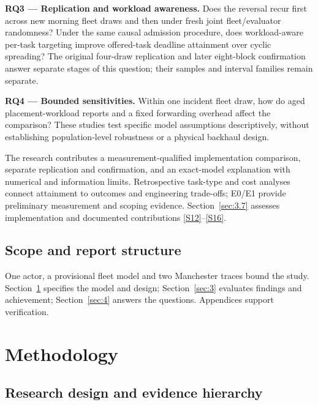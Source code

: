 \documentclass[11pt,a4paper]{article}
\begin{document}
\textbf{RQ3 --- Replication and workload awareness.} Does the reversal recur first across new morning fleet draws and then under fresh joint fleet/evaluator randomness? Under the same causal admission procedure, does workload-aware per-task targeting improve offered-task deadline attainment over cyclic spreading? The original four-draw replication and later eight-block confirmation answer separate stages of this question; their samples and interval families remain separate.

\textbf{RQ4 --- Bounded sensitivities.} Within one incident fleet draw, how do aged placement-workload reports and a fixed forwarding overhead affect the comparison? These studies test specific model assumptions descriptively, without establishing population-level robustness or a physical backhaul design.

The research contributes a measurement-qualified implementation comparison, separate replication and confirmation, and an exact-model explanation with numerical and information limits. Retrospective task-type and cost analyses connect attainment to outcomes and engineering trade-offs; E0/E1 provide preliminary measurement and scoping evidence. Section~\ref{sec:3.7} assesses implementation and documented contributions \hyperref[source-s12]{[S12]}--\hyperref[source-s16]{[S16]}.

\subsection{Scope and report structure}\label{sec:1.4}

One actor, a provisional fleet model and two Manchester traces bound the study. Section~\ref{sec:2} specifies the model and design; Section~\ref{sec:3} evaluates findings and achievement; Section~\ref{sec:4} answers the questions. Appendices support verification.

\section{Methodology}\label{sec:2}

\subsection{Research design and evidence hierarchy}\label{sec:2.1}
\end{document}
